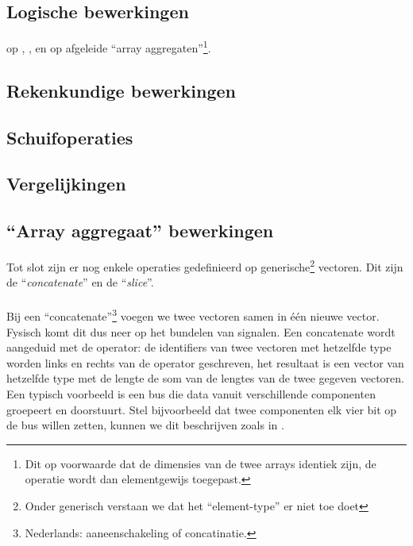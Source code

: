 \subsection{Logische bewerkingen}
op , ,  en op afgeleide ``array aggregaten''\footnote{Dit op voorwaarde dat de dimensies van de twee arrays identiek zijn, de operatie wordt dan elementgewijs toegepast.}.

\subsection{Rekenkundige bewerkingen}

\subsection{Schuifoperaties}

\subsection{Vergelijkingen}

\subsection{``Array aggregaat'' bewerkingen}
Tot slot zijn er nog enkele operaties gedefinieerd op generische\footnote{Onder generisch verstaan we dat het ``element-type'' er niet toe doet} vectoren. Dit zijn de ``\emph{concatenate}'' en de ``\emph{slice}''.

\paragraph{}
Bij een ``concatenate''\footnote{Nederlands: aaneenschakeling of concatinatie.} voegen we twee vectoren samen in \'e\'en nieuwe vector. Fysisch komt dit dus neer op het bundelen van signalen. Een concatenate wordt aangeduid met de \vhdltermen{\&} operator: de identifiers van twee vectoren met hetzelfde type worden links en rechts van de operator geschreven, het resultaat is een vector van hetzelfde type met de lengte de som van de lengtes van de twee gegeven vectoren. Een typisch voorbeeld is een bus die data vanuit verschillende componenten groepeert en doorstuurt. Stel bijvoorbeeld dat twee componenten elk vier bit op de bus willen zetten, kunnen we dit beschrijven zoals in .


